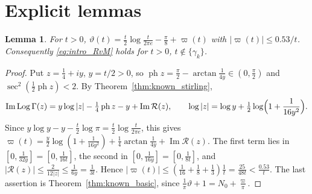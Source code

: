 \documentclass[11pt,a4paper]{article}
\makeatletter
\numberwithin{equation}{section}
\DeclareRobustCommand{\CGref}[1]{\ref{#1}}
\DeclareRobustCommand{\CGeqref}[1]{\eqref{#1}}
\let\CG@origref\ref
\let\CG@origeqref\eqref
\newcommand{\CG@gettip}[1]{\@ifundefined{CGTip@#1}{#1}{\csname CGTip@#1\endcsname}}
\DeclareRobustCommand{\CGref}[1]{\pdftooltip{\CG@origref{#1}}{\CG@gettip{#1}}}
\DeclareRobustCommand{\CGeqref}[1]{\pdftooltip{\CG@origeqref{#1}}{\CG@gettip{#1}}}
\newtheorem{lemma}[theorem]{Lemma}
\theoremstyle{definition}
\theoremstyle{remark}
\newcommand{\Nz}{N_0} %
\makeatother
\begin{document}
\section{Explicit lemmas}\label{sec:explicit_lemmas}

\begin{lemma}\label{lem:varpi}
For $t>0$, $\vartheta(t)=\frac t2\log\frac t{2\pi e}-\frac\pi8+\varpi(t)$ with $|\varpi(t)|\le0.53/t$. Consequently \CGeqref{eq:intro_RvM} holds for $t>0$, $t\notin\{\gamma_k\}$.
\end{lemma}

\begin{proof}
Put $z=\frac14+iy$, $y=t/2>0$, so $\operatorname{ph}z=\frac\pi2-\arctan\frac1{4y}\in(0,\frac\pi2)$ and $\sec^2(\frac12\operatorname{ph}z)<2$. By Theorem~\CGref{thm:known_stirling},
\begin{equation}
\operatorname{Im}\operatorname{Log}\Gamma(z)=y\log|z|-\tfrac14\operatorname{ph}z-y+\operatorname{Im}\mathcal R(z),\qquad \log|z|=\log y+\tfrac12\log\Bigl(1+\frac1{16y^2}\Bigr).
\label{eq:disp_10}
\end{equation}
Since $y\log y-y-\frac t2\log\pi=\frac t2\log\frac t{2\pi e}$, this gives $\varpi(t)=\frac y2\log(1+\frac1{16y^2})+\frac14\arctan\frac1{4y}+\operatorname{Im}\mathcal R(z)$. The first term lies in $[0,\frac1{32y}]=[0,\frac1{16t}]$, the second in $[0,\frac1{16y}]=[0,\frac1{8t}]$, and $|\mathcal R(z)|\le\frac2{12|z|}\le\frac1{6y}=\frac1{3t}$. Hence $|\varpi(t)|\le(\frac1{16}+\frac18+\frac13)\frac1t=\frac{25}{48t}<\frac{0.53}t$. The last assertion is Theorem~\CGref{thm:known_basic}, since $\frac1\pi\vartheta+1=\Nz+\frac\varpi\pi$.
\end{proof}
\end{document}
